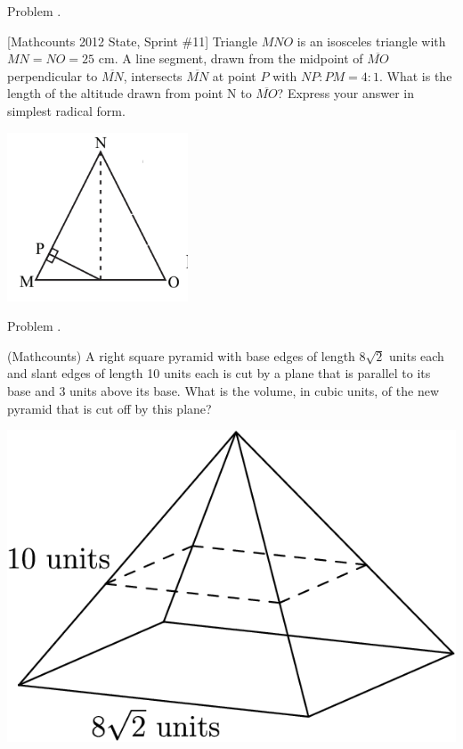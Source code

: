 \documentclass[9pt]{beamer}
\newcounter{problem}[section]
\begin{document}
\begin{frame}[t, fragile]{Problem \thesection.\theproblem}
    \begin{block}{}[Mathcounts 2012 State, Sprint \#11]
    Triangle $MNO$ is an isosceles triangle with $MN=NO=25$ cm. A line segment, drawn from the midpoint of $\overline{MO}$ perpendicular to $\overline{MN}$, intersects $\overline{MN}$ at point $P$ with $NP:PM=4:1$. What is the length of the altitude drawn from point N to $\overline{MO}$? Express your answer in simplest radical form.
    \end{block}
    \begin{center}
        \includegraphics[height=50mm,scale=0.25]{11.png}
    \end{center}
    

\end{frame}

\begin{frame}[t, fragile]{Problem \thesection.\theproblem}
    \begin{block}{}
    (Mathcounts) A right square pyramid with base edges of length $8\sqrt{2}$ units each and slant edges of length 10 units each is cut by a plane that is parallel to its base and 3 units above its base. What is the volume, in cubic units, of the new pyramid that is cut off by this plane?
    \end{block}
    \begin{center}
        \includegraphics[scale=0.4]{56c724eb5297fe3abad02162d5be307b3f7e10f0.png}
    \end{center} 
    
\end{frame}
\end{document}
